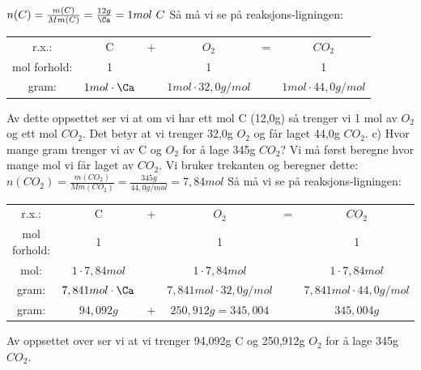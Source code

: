 \documentclass[12pt,a4paper]{article}
\begin{document}
$n(C)=\frac{m(C)}{Mm(C)}=\frac{12g}{\Ca}=1mol \ C$\nl
Så må vi se på reaksjons-ligningen:\nl
\begin{table}[H]
    \centering
    \begin{tabular}{cccccc}
         r.x.:& C&+ &$O_2$&= & $CO_2$\\
         mol forhold:&1 &  & 1 &  &1 \\
         gram:&$1mol\cdot\Ca$ &  &$1mol\cdot 32,0g/mol$  &  &$1mol\cdot 44,0g/mol$ \\
    \end{tabular}
\end{table}\nl
Av dette oppsettet ser vi at om vi har ett mol C (12,0g) så trenger vi 1 mol av $O_2$ og ett mol $CO_2$. Det betyr at vi trenger 32,0g $O_2$ og får laget 44,0g $CO_2$. 
\newpage
c) Hvor mange gram trenger vi av C og $O_2$ for å lage 345g $CO_2$?\nl
Vi må først beregne hvor mange mol vi får laget av $CO_2$.  Vi bruker trekanten og beregner dette:\nl
$n(CO_2)=\frac{m(CO_2)}{Mm(CO_2)}=\frac{345g}{44,0g/mol}=7,84mol$\nl
Så må vi se på reaksjons-ligningen:\nl
\begin{table}[H]
    \centering
    \begin{tabular}{cccccc}
         r.x.:& C&+ &$O_2$&= & $CO_2$\\
         mol forhold:&1 &  & 1 &  &1 \\
         mol:&$1\cdot 7,84mol$ &  &$1\cdot 7,84mol$  &  &$1\cdot 7,84mol$ \\
         gram:&$7,841mol\cdot\Ca$ &  &$7,841mol\cdot 32,0g/mol$  &  &$7,841mol\cdot 44,0g/mol$ \\
         gram:&$94,092g$ & + &$250,912g=345,004$  &  &$345,004g$ \\
    \end{tabular}
\end{table}\nl
Av oppsettet over ser vi at vi trenger 94,092g C og 250,912g $O_2$ for å lage 345g $CO_2$.
\nl[2]
\end{document}
